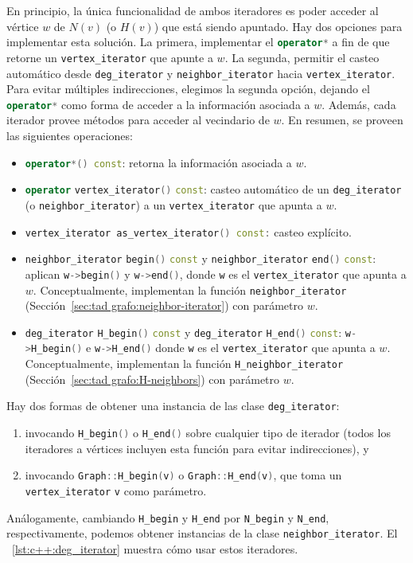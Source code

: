 \documentclass[%
    a4paper,%
    fontsize=12pt,%
    DIV=12,
    twoside,%
    openright,%
    titlepage=true,%
    headsepline,%
    toc=bibliography,%
    parskip=half,%
    cleardoublepage=empty,%
    headings=big,%
]{scrbook}
\makeatletter
\newcommand{\Code}[1]{\lstinline[basicstyle={\ttfamily}]@#1@}
\newcommand{\CPPCode}[1]{\lstinline[language=C++,basicstyle={\ttfamily}]@#1@}
\makeatother
\begin{document}
En principio, la única funcionalidad de ambos iteradores es poder acceder al vértice $w$ de $N(v)$ (o $H(v)$) que está siendo apuntado.  Hay dos opciones para implementar esta solución.  La primera, implementar el \CPPCode{operator*} a fin de que retorne un \CPPCode{vertex_iterator} que apunte a $w$.  La segunda, permitir el casteo automático desde \CPPCode{deg_iterator} y \CPPCode{neighbor_iterator} hacia \CPPCode{vertex_iterator}.  Para evitar múltiples indirecciones, elegimos la segunda opción, dejando el \CPPCode{operator*} como forma de acceder a la información asociada a $w$.  Además, cada iterador provee métodos para acceder al vecindario de $w$.  En resumen, se proveen las siguientes operaciones:
\begin{itemize}
  \item \CPPCode{operator*() const}: retorna la información asociada a $w$.
  \item \CPPCode{operator} \CPPCode{vertex_iterator()} \CPPCode{const}: casteo automático de un \CPPCode{deg_iterator} (o \CPPCode{neighbor_iterator}) a un \CPPCode{vertex_iterator} que apunta a $w$.
  \item \CPPCode{vertex_iterator as_vertex_iterator() const:} casteo explícito.
  \item \CPPCode{neighbor_iterator} \CPPCode{begin()} \CPPCode{const} y \CPPCode{neighbor_iterator} \CPPCode{end()} \CPPCode{const}: aplican \CPPCode{w->begin()} y \CPPCode{w->end()}, donde \CPPCode{w} es el \CPPCode{vertex_iterator} que apunta a $w$.   Conceptualmente, implementan la función \Code{neighbor_iterator} (Sección~\ref{sec:tad grafo:neighbor-iterator}) con parámetro $w$.
  \item \CPPCode{deg_iterator} \CPPCode{H_begin()} \CPPCode{const} y \CPPCode{deg_iterator} \CPPCode{H_end()} \CPPCode{const}:  \CPPCode{w->H_begin()} e \CPPCode{w->H_end()} donde \CPPCode{w} es el \CPPCode{vertex_iterator} que apunta a $w$. Conceptualmente, implementan la función \Code{H_neighbor_iterator} (Sección~\ref{sec:tad grafo:H-neighbors}) con parámetro $w$.  
\end{itemize}

Hay dos formas de obtener una instancia de las clase \CPPCode{deg_iterator}: 
\begin{enumerate}[1.]
  \item invocando \CPPCode{H_begin()} o \CPPCode{H_end()} sobre cualquier tipo de iterador (todos los iteradores a vértices incluyen esta función para evitar indirecciones), y 
  \item invocando \CPPCode{Graph::H_begin(v)} o \CPPCode{Graph::H_end(v)}, que toma un \CPPCode{vertex_iterator} \CPPCode{v} como parámetro.
\end{enumerate}
Análogamente, cambiando \CPPCode{H_begin} y \CPPCode{H_end} por \CPPCode{N_begin} y \CPPCode{N_end}, respectivamente, podemos obtener instancias de la clase \CPPCode{neighbor_iterator}.  El \lstlistingname~\ref{lst:c++:deg_iterator} muestra cómo usar estos iteradores.
\end{document}
